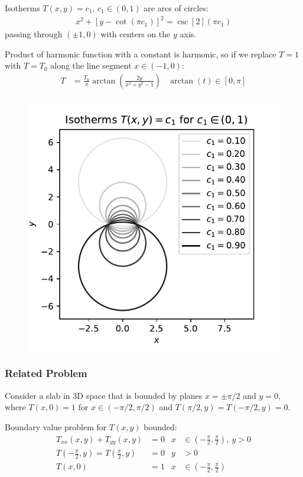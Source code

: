 \documentclass[12pt, english]{book}
\begin{document}
	Isotherms \(T(x,y) = c_1\), \(c_1 \in (0,1)\) are arcs of circles:
	\begin{align*}
		x^2 + [y - \cot(\pi c_1)]^2 = \csc[2](\pi c_1)
	\end{align*}
	passing through \((\pm 1, 0)\) with centers on the \(y\) axis.
	
	Product of harmonic function with a constant is harmonic, so if we replace \(T = 1\) with \(T = T_0\) along the line segment \(x \in (-1, 0)\):
	\begin{align*}
		T &= \frac{T_0}{\pi} \arctan(\frac{2y}{x^2 + y^2 - 1}) &
		\arctan(t) \in [0, \pi]
	\end{align*}
	
	\begin{figure}[H]
		\centering
		\includegraphics[width=0.45\linewidth]{Python/Steady_Temperatuers_In_Half_Plane}
		\caption*{}
		\label{fig:steadytemperatuersinhalfplane}
	\end{figure}
	
	\subsubsection{Related Problem}
	
	Consider a slab in 3D space that is bounded by planes \(x = \pm \pi/2\) and \(y = 0\), where \(T(x, 0) = 1\) for \(x \in (-\pi/2, \pi/2)\) and \(T(\pi/2, y) = T(-\pi/2, y) = 0\).
	
	Boundary value problem for \(T(x,y)\) bounded:
	\begin{align*}
		T_{xx}(x,y) + T_{yy}(x,y) &= 0
			& x &\in \left(-\frac{\pi}{2}, \frac{\pi}{2}\right), \ y>0 \\
		T\left(-\frac{\pi}{2}, y\right) = T\left(\frac{\pi}{2}, y\right) &= 0
			& y&>0 \\
		T(x,0) &= 1
			& x &\in \left(-\frac{\pi}{2}, \frac{\pi}{2}\right)
	\end{align*}
\end{document}

